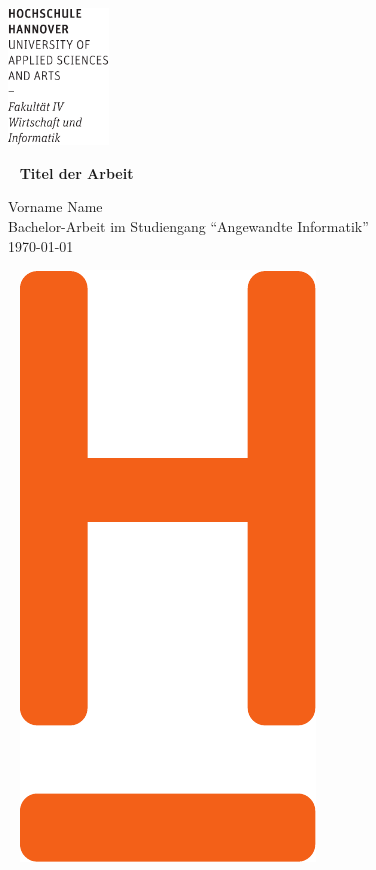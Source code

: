\documentclass[
  twoside,
  paper=a4,
  fontsize=12pt,
  parskip=half-,
  headsepline,
  headinclude]{scrreprt}
\begin{document}


\thispagestyle{empty} %
\includegraphics[width=0.2\textwidth]{Wortmarke_WI_schwarz}

{  ~ \sffamily
  \vfill
  {\Huge\bfseries Titel der Arbeit}
  \bigskip

  {\Large
    Vorname Name \\[2ex]
    Bachelor-Arbeit im Studiengang "`Angewandte Informatik"'
    \\[5ex]
    \today }
}
\vfill

~ \hfill
\includegraphics[height=0.3\paperheight]{H_WI_Pantone1665}

\vspace*{-3cm}
\end{document}

